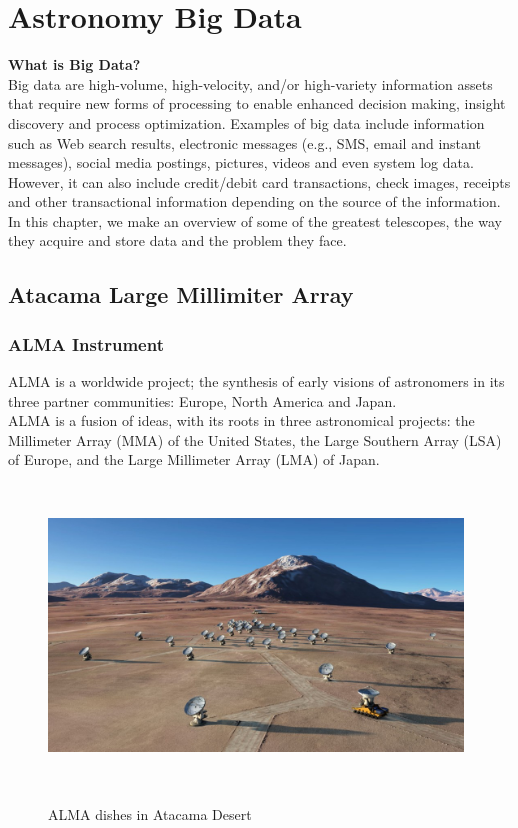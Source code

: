 \chapter{Astronomy Big Data}


\textbf{What is Big Data?} \\

Big data are high-volume, high-velocity, and/or high-variety information assets that require new forms of processing to enable enhanced decision making, insight discovery and process optimization. Examples of big data include information such as Web search results, electronic messages (e.g., SMS, email and instant messages), social media postings, pictures, videos and even system log data.  However, it can also include credit/debit card transactions, check images, receipts and other transactional information depending on the source of the information. \\

In this chapter, we make an overview of some of the greatest telescopes, the way they acquire and store data and the problem they face.


\section{Atacama Large Millimiter Array}

\subsection{ALMA Instrument}

ALMA is a worldwide project; the synthesis of early visions of astronomers in its three partner communities: Europe, North America and Japan.\\

ALMA is a fusion of ideas, with its roots in three astronomical projects: the Millimeter Array (MMA) of the United States, the Large Southern Array (LSA) of Europe, and the Large Millimeter Array (LMA) of Japan.\\

\begin{figure}
\centering
\includegraphics[width=11cm,height=8cm]{images/alma.jpg}\\
\caption{ALMA dishes in Atacama Desert}
\end{figure}


